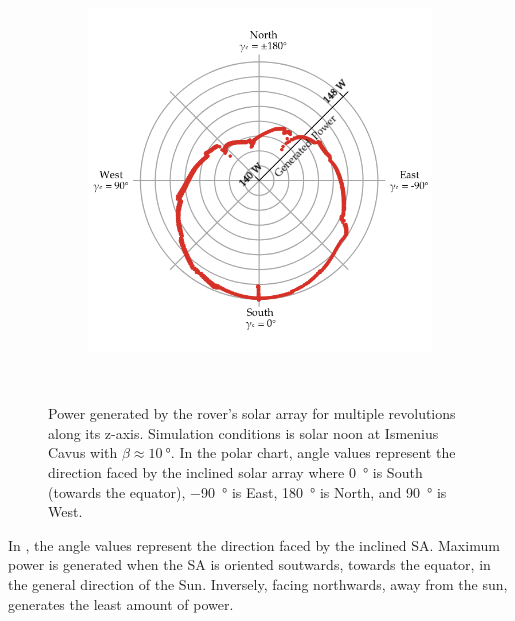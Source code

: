 \begin{figure}[h]
\begin{subfigure}[t]{\subfigureWidth}
        \includegraphics[height=\graphicsHeight]{sections/design/simulation/plots/zaxis-revolutions-polar.png}
		\label{fig:sub:simulation-data-rover-revolution-generated-power-polar-chart}
	\end{subfigure}\\[0.6ex]
    \caption[Power generated by the rover's solar array for multiple revolutions along its z-axis]
            {Power generated by the rover's solar array for multiple revolutions along its z-axis. Simulation conditions is solar noon at Ismenius Cavus with $\beta \approx \SI{10}{\degree}$. In the polar chart, angle values represent the direction faced by the inclined solar array where \SI{0}{\degree} is South (towards the equator), \SI{-90}{\degree} is East, \SI{180}{\degree} is North, and \SI{90}{\degree} is West.}
    \label{fig:simulation-data-rover-revolution-generated-power}
\vspace{-2ex}
\end{figure}


In , the angle values represent the direction faced by the inclined \ac{SA}. Maximum power is generated when the \ac{SA} is oriented soutwards, towards the equator, in the general direction of the Sun. Inversely, facing northwards, away from the sun, generates the least amount of power.

